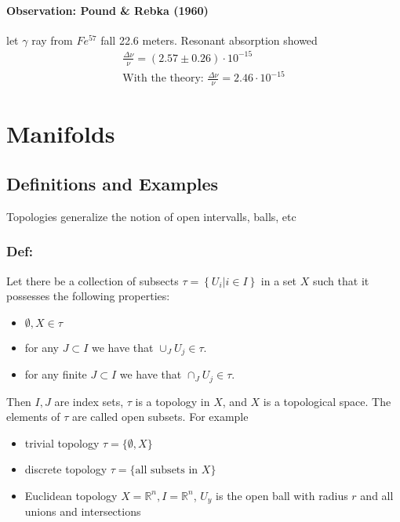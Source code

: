 \subsubsection{Observation: Pound \& Rebka (1960)}
let $\gamma$ ray from $Fe^{57}$ fall 22.6 meters. Resonant absorption showed
\begin{gather}
	\frac{\Delta \nu}{\nu} = (2.57 \pm 0.26)\cdot 10^{-15}\\
	\text{With the theory: } \frac{\Delta \nu}{\nu} = 2.46\cdot 10^{-15}
\end{gather}


\chapter{Manifolds}
\section{Definitions and Examples}
Topologies generalize the notion of open intervalls, balls, etc

\subsection{Def:}
Let there be a collection of subsects $\tau = \left\{U_i|i\in I\right\}$ in a set $X$ such that it possesses the following properties:
\begin{itemize}
	\item $\emptyset, X \in \tau$
	\item for any $J\subset I$ we have that $\cup_J U_j \in \tau$.
	\item for any finite $J\subset I$ we have that $\cap_J U_j \in \tau$.
\end{itemize}
Then $I,J$ are index sets, $\tau$ is a topology in $X$, and $X$ is a topological space. The elements of $\tau$ are called open subsets. For example
\begin{itemize}
	\item trivial topology $\tau = \{\emptyset, X\}$
	\item discrete topology $\tau = \{\text{all subsets in }X\}$
	\item Euclidean topology $X=\mathbb R^n, I=\mathbb R^n$, $U_y$ is the open ball with radius $r$ and all unions and intersections
\end{itemize}














